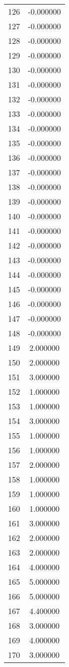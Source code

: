 \documentclass[12pt]{article}
\begin{document}
\begin{longtable}{@{}cc@{}}
126 & -0.000000 \\
127 & -0.000000 \\
128 & -0.000000 \\
129 & -0.000000 \\
130 & -0.000000 \\
131 & -0.000000 \\
132 & -0.000000 \\
133 & -0.000000 \\
134 & -0.000000 \\
135 & -0.000000 \\
136 & -0.000000 \\
137 & -0.000000 \\
138 & -0.000000 \\
139 & -0.000000 \\
140 & -0.000000 \\
141 & -0.000000 \\
142 & -0.000000 \\
143 & -0.000000 \\
144 & -0.000000 \\
145 & -0.000000 \\
146 & -0.000000 \\
147 & -0.000000 \\
148 & -0.000000 \\
149 & 2.000000 \\
150 & 2.000000 \\
151 & 3.000000 \\
152 & 1.000000 \\
153 & 1.000000 \\
154 & 3.000000 \\
155 & 1.000000 \\
156 & 1.000000 \\
157 & 2.000000 \\
158 & 1.000000 \\
159 & 1.000000 \\
160 & 1.000000 \\
161 & 3.000000 \\
162 & 2.000000 \\
163 & 2.000000 \\
164 & 4.000000 \\
165 & 5.000000 \\
166 & 5.000000 \\
167 & 4.400000 \\
168 & 3.000000 \\
169 & 4.000000 \\
170 & 3.000000 \\

\end{longtable}
\end{document}
